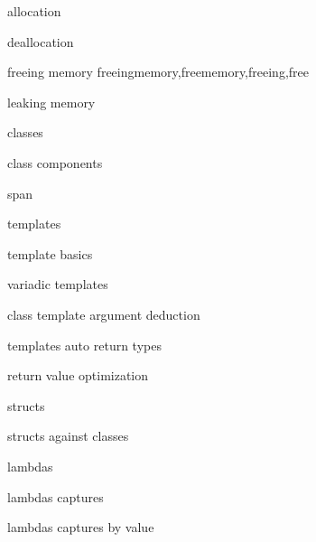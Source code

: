          allocation 
        
         deallocation 
        
         freeing memory 
        freeingmemory,freememory,freeing,free 
        
         leaking memory 
        
         classes 
        
         class components 
        
         span 
        
         templates
        
         template basics 
        
         variadic templates
        
         class template argument deduction 
        
         templates auto return types 
        
         return value optimization 
        
         structs 
        
         structs against classes 
        
         lambdas
        
         lambdas captures
        
         lambdas captures by value
        
